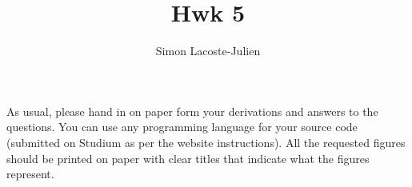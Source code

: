 \documentclass[12pt]{article}
\title{Hwk 5}
\author{Simon Lacoste-Julien}
\newcommand{\1}{{\bf 1}}
\begin{document}
\fancyhead{}
\fancyfoot{}



As usual, please hand in on paper form your derivations and answers to the questions. You can use any programming language for your source code (submitted on Studium as per the website instructions). All the requested figures should be printed on paper with clear titles that indicate what the figures represent.
\end{document}
